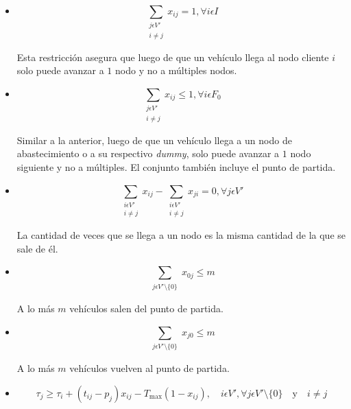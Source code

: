 \documentclass[letter, 10pt]{article}
\begin{document}
\begin{itemize}
\item 
\begin{equation*}
\sum_{\substack{j \epsilon V' \\ i \neq j}} x_{ij} = 1, \forall i \epsilon I
\end{equation*}

Esta restricción asegura que luego de que un vehículo llega al nodo cliente \(i\) solo puede avanzar a \(1\) nodo y no a múltiples nodos.

\item
\begin{equation*}
\sum_{\substack{j \epsilon V' \\ i \neq j}} x_{ij} \leq 1, \forall i \epsilon F_0
\end{equation*}

Similar a la anterior, luego de que un vehículo llega a un nodo de abastecimiento o a su respectivo \textit{dummy}, solo puede avanzar a \(1\) nodo siguiente y no a múltiples. El conjunto también incluye el punto de partida.

\item
\begin{equation*}
\sum_{\substack{i \epsilon V' \\ i \neq j}} x_{ij} - 
\sum_{\substack{i \epsilon V' \\ i \neq j}} x_{ji} = 0, \forall j \epsilon V'
\end{equation*}

La cantidad de veces que se llega a un nodo es la misma cantidad de la que se sale de él.

\item
\begin{equation*}
\sum_{\substack{j \epsilon V' \setminus \lbrace 0 \rbrace}} x_{0j} \leq m
\end{equation*}

A lo más \(m\) vehículos salen del punto de partida.

\item
\begin{equation*}
\sum_{\substack{j \epsilon V' \setminus \lbrace 0 \rbrace}} x_{j0} \leq m
\end{equation*}

A lo más \(m\) vehículos vuelven al punto de partida.

\item
\begin{equation*}
\tau_j \geq \tau_i + (t_{ij} - p_j)x_{ij} - T_{\mbox{max}}(1-x_{ij}), \quad 
	 i \epsilon V', \forall j \epsilon V' \setminus
		\lbrace 0 \rbrace \quad \mbox{y} \quad i \neq j
\end{equation*}


\end{itemize}
\end{document}
